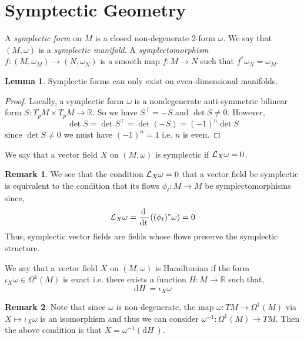 \documentclass[12pt]{extarticle}
\newcommand{\R}{\mathbb{R}}
\renewcommand{\d}[1]{ \mathrm{d}#1 \:}
\newcommand{\deriv}[2]{\frac{\d{#1}}{\d{#2}}}
\theoremstyle{definition}
\newtheorem{lemma}[theorem]{Lemma}
\newtheorem{remark}{Remark}
\newenvironment{definition}[1][Definition:]{\begin{trivlist}
\item[\hskip \labelsep {\bfseries #1}]}{\end{trivlist}}
\begin{document}
\section{Symptectic Geometry}

\begin{definition}
A \textit{symplectic form} on $M$ is a closed non-degenerate $2$-form $\omega$. We say that $(M, \omega)$ is a \textit{symplectic manifold}. A \textit{symplectomorphism} $f : (M, \omega_M) \to (N, \omega_N)$ is a smooth map $f : M \to N$ such that $f^* \omega_N = \omega_M$. 
\end{definition}

\begin{lemma}
Symplectic forms can only exist on even-dimensional manifolds. 
\end{lemma}

\begin{proof}
Locally, a symplectic form $\omega$ is a nondegenerate anti-symmetric bilinear form $S : T_p M \times T_p M \to \R$. So we have $S^\top = - S$ and $\det{S} \neq 0$. However, \[ \det{S} = \det{S^\top} = \det{(- S)} = (-1)^n \det{S} \]
since $\det{S} \neq 0$ we must have $(-1)^n = 1$ i.e. $n$ is even.
\end{proof}

\begin{definition}
We say that a vector field $X$ on $(M, \omega)$ is symplectic if $\mathcal{L}_X \omega = 0$.
\end{definition}

\begin{remark}
We see that the condition $\mathcal{L}_X \omega = 0$ that a vector field be symplectic is equivalent to the condition that its flows $\phi_t :  M \to M$ be symplectomorphisms since,
\[ \L_X \omega = \deriv{}{t} ((\phi_t)^* \omega) = 0 \]
Thus, symplectic vector fields are fields whose flows preserve the symplectic structure.
\end{remark}

\begin{definition}
We say that a vector field $X$ on $(M, \omega)$ is Hamiltonian if the form $\iota_X \omega \in \Omega^1(M)$ is exact i.e. there exists a function $H : M \to \R$ such that,
\[ \d{H} = \iota_X \omega \]
\end{definition}

\begin{remark}
Note that since $\omega$ is non-degenerate, the map $\omega : TM \to \Omega^1(M)$ via $X \mapsto \iota_X \omega$ is an isomorphism and thus we can consider $\omega^{-1} : \Omega^1(M) \to TM$. Then the above condition is that $X = \omega^{-1}(\d{H})$. 
\end{remark}
\end{document}
